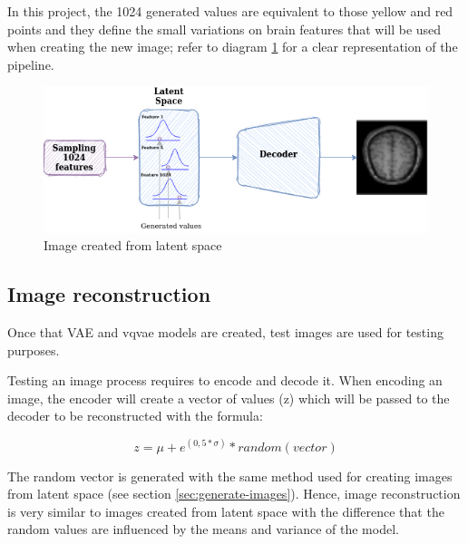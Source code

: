 In this project, the 1024 generated values are equivalent to those yellow and red points and they define the small variations on brain features that will be used when creating the new image; refer to diagram \ref{fig:image-from-latent-space-diagram} for a clear representation of the pipeline.

\begin{figure}[ht]
    \centering
    \includegraphics[width = 14cm]{images/tfm-vae-latent-space.png}
    \caption[Image created from latent space]{Image created from latent space}
    \label{fig:image-from-latent-space-diagram}
\end{figure}

\subsection{Image reconstruction}

Once that VAE and \acrshort{vqvae} models are created, test images are used for testing purposes.

Testing an image process requires to encode and decode it. When encoding an image, the encoder will create a vector of values (z) which will be passed to the decoder to be reconstructed with the formula:

\begin{equation}
    z = \mu  + e^{(0,5 * \sigma)} * random(vector)
\end{equation}

The random vector is generated with the same method used for creating images from latent space (see section \ref{sec:generate-images}). Hence, image reconstruction is very similar to images created from latent space with the difference that the random values are influenced by the means and variance of the model.